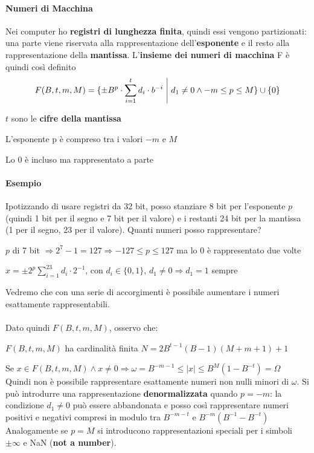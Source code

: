 \documentclass[10pt]{book}
\begin{document}
\paragraph{Numeri di Macchina} Nei computer ho \textbf{registri di lunghezza finita}, quindi essi vengono partizionati: una parte viene riservata alla rappresentazione dell'\textbf{esponente} e il resto alla rappresentazione della \textbf{mantissa}. L'\textbf{insieme dei numeri di macchina} F è quindi così definito
$$F(B, t, m, M) = \{\pm B^p \cdot \sum_{i=1}^t d_i \cdot b^{-i}\:\:\vline\:\: d_1 \neq 0 \wedge -m \leq p \leq M\} \cup \{0\}$$
\begin{list}{}{dove}
	\item $t$ sono le \textbf{cifre della mantissa}
	\item L'esponente p è compreso tra i valori $-m$ e $M$
	\item Lo 0 è incluso ma rappresentato a parte
\end{list}
\paragraph{Esempio} Ipotizzando di usare registri da 32 bit, posso stanziare 8 bit per l'esponente $p$ (quindi 1 bit per il segno e 7 bit per il valore) e i restanti 24 bit per la mantissa (1 per il segno, 23 per il valore). Quanti numeri posso rappresentare?
\begin{list}{}{}
	\item $p$ di 7 bit $\Rightarrow 2^7 - 1 = 127 \Rightarrow -127 \leq p \leq 127$ ma lo 0 è rappresentato due volte
	\item $x = \pm2^p \sum_{i=1}^23 d_i \cdot 2^{-1}$, con $d_i \in \{0, 1\}$, $d_1 \neq 0 \Rightarrow d_1 = 1$ sempre
\end{list}
Vedremo che con una serie di accorgimenti è possibile aumentare i numeri esattamente rappresentabili.\\\\
Dato quindi $F(B, t, m, M)$, osservo che:
\begin{list}{}{}
	\item $F(B, t, m, M)$ ha cardinalità finita $N = 2B^{t-1}(B - 1)(M + m + 1) + 1$
	\item Se $x \in F(B, t, m, M) \wedge x \neq 0 \Rightarrow \omega = B^{-m-1} \leq |x| \leq B^M(1 - B^{-t}) = \Omega$\\
	Quindi non è possibile rappresentare esattamente numeri non nulli minori di $\omega$. Si può introdurre una rappresentazione \textbf{denormalizzata} quando $p = -m$: la condizione $d_1 \neq 0$ può essere abbandonata e posso così rappresentare numeri positivi e negativi compresi in modulo tra $B^{-m-t}$ e $B^{-m}(B^{-1} - B^{-t})$\\
	Analogamente se $p = M$ si introducono rappresentazioni speciali per i simboli $\pm\infty$ e NaN (\textbf{not a number}).
\end{list}
\end{document}
